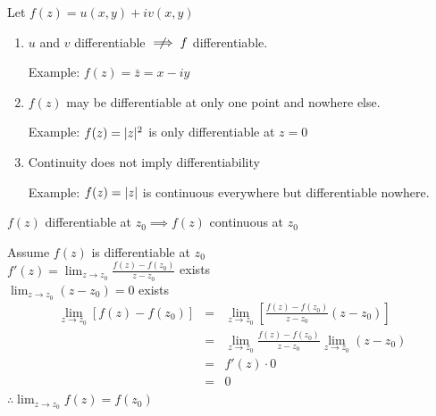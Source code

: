 \documentclass[letterpaper,12pt,fleqn]{article}
\newcommand{\limz}{\lim_{z\to z_0}}
\begin{document}
\begin{properties}[Consequences]
  Let $f(z)=u(x,y)+iv(x,y)$
  \begin{enumerate}
  \item $u$ and $v$ differentiable $\centernot\implies f$ differentiable.
    
    Example: $f(z)=\bar{z}=x-iy$

  \item $f(z)$ may be differentiable at only one point and nowhere else.

    Example: $f(z)=\lvert z\rvert^2$ is only differentiable at $z=0$

  \item Continuity does not imply differentiability

    Example: $f(z)=\lvert z\rvert$ is continuous everywhere but differentiable
    nowhere.
  \end{enumerate}
\end{properties}

\begin{theorem}
  $f(z)$ differentiable at $z_0\implies f(z)$ continuous at $z_0$
\end{theorem}

\begin{theproof}
  Assume $f(z)$ is differentiable at $z_0$ \\
  $f'(z)=\limz{\frac{f(z)-f(z_0)}{z-z_0}}$ exists \\
  $\limz{(z-z_0)}=0$ exists \\
  \begin{eqnarray*}
    \limz{[f(z)-f(z_0)]} &=&
    \limz{\left[\frac{f(z)-f(z_0)}{z-z_0}(z-z_0)\right]} \\
    &=& \limz{\frac{f(z)-f(z_0)}{z-z_0}}\limz{(z-z_0)} \\
    &=& f'(z)\cdot0 \\
    &=& 0 \\
  \end{eqnarray*}
  $\therefore \limz{f(z)}=f(z_0)$
\end{theproof}
\end{document}
